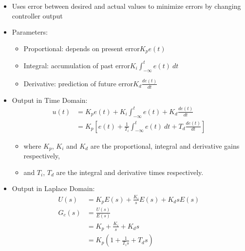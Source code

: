 \documentclass[a4paper]{article}
\begin{document}
\begin{center}
\end{center}
\begin{itemize}
    \item Uses error between desired and actual values to minimize errors by changing controller output
    \item Parameters:
    \begin{itemize}[label=$\circ$]
        \item Proportional: depends on present error\quad $K_pe(t)$
        \item Integral: accumulation of past error\quad $K_i\int_{-\infty}^t e(t)\ dt$
        \item Derivative: prediction of future error\quad$K_d\frac{de(t)}{dt}$
    \end{itemize}
    \item Output in Time Domain: 
    \begin{align*}
        u(t) &= K_pe(t)+K_i\int_{-\infty}^t e(t)+K_d\frac{de(t)}{dt}\\
        &= K_p\left[e(t)+\frac{1}{T_i}\int_{-\infty}^t e(t)\ dt+T_d\displaystyle\frac{de(t)}{dt}\right]
    \end{align*}
    \begin{itemize}[label=$\circ$]
        \item where $K_p$, $K_i$ and $K_d$ are the proportional, integral and derivative gains respectively,
        \item and $T_i$, $T_d$ are the integral and derivative times respectively.
    \end{itemize}
    \item Output in Laplace Domain:
    \begin{align*}
        U(s) &= K_pE(s)+\frac{K_i}{s}E(s)+K_dsE(s)\\
        G_c(s) &= \frac{U(s)}{E(s)}\\
        &= K_p+\frac{K_i}{s}+K_ds\\
        &= K_p\left(1+\frac{1}{T_is}+T_ds\right)
    \end{align*}
\end{itemize}
\end{document}
